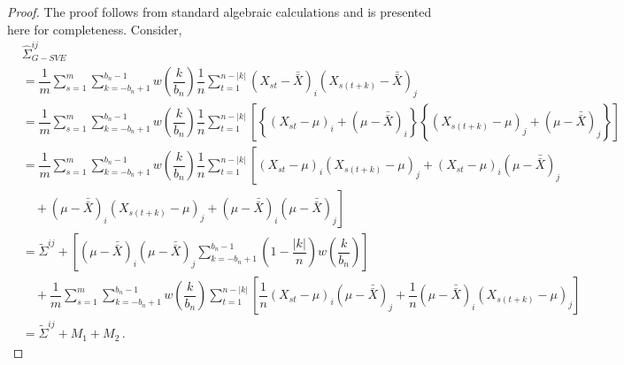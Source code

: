 \documentclass[11pt]{article}
\theoremstyle{remark}
\begin{document}
\begin{proof}
The proof follows from standard algebraic calculations and is presented here for completeness. Consider,
\begin{align*}
&\hat{\Sigma}_{G-SVE}^{ij} \\
&= \dfrac{1}{m}\sum_{s=1}^{m} \sum_{k=-b_n+1}^{b_n-1}w\left(\dfrac{k}{b_n}\right)\dfrac{1}{n}\sum_{t=1}^{n-|k|} \left(X_{st}-\bar{\bar{X}} \right)_i \left(X_{s(t+k)}-\bar{\bar{X}} \right)_j\\
&= \dfrac{1}{m}\sum_{s=1}^{m}\sum_{k=-b_n+1}^{b_n-1}w\left(\dfrac{k}{b_n}\right)\dfrac{1}{n}\sum_{t=1}^{n-|k|} \left[  \left\{\left(X_{st}-\mu \right)_i + \left(\mu-\bar{\bar{X}} \right)_i \right \}  \left\{ \left(X_{s(t+k)}-\mu \right)_j + \left(\mu-\bar{\bar{X}} \right)_j \right \} \right]\\
&= \dfrac{1}{m}\sum_{s=1}^{m}\sum_{k=-b_n+1}^{b_n-1}w\left(\dfrac{k}{b_n}\right)\dfrac{1}{n}\sum_{t=1}^{n-|k|}  \left[ \left(X_{st}-\mu \right)_i  \left(X_{s(t+k)}-\mu \right)_j+  \left(X_{st} - \mu \right)_i    \left(\mu - \bar{\bar{X}} \right)_j \right. \\  
& \quad + \left. \left(\mu-\bar{\bar{X}} \right)_i  \left(X_{s(t+k)}-\mu \right)_j + \left(\mu-\bar{\bar{X}} \right)_i  \left(\mu-\bar{\bar{X}}  \right)_j  \right]\\
& = \tilde{\Sigma}^{ij} + \left[(\mu-\bar{\bar{X}})_i(\mu-\bar{\bar{X}})_j\sum_{k=-b_n+1}^{b_n-1}\left(1-\dfrac{|k|}{n}\right)w\left(\dfrac{k}{b_n}\right)\right] \\ 
& \quad  + \dfrac{1}{m}\sum_{s=1}^{m}\sum_{k=-b_n+1}^{b_n-1}  w\left(\dfrac{k}{b_n}\right)\sum_{t=1}^{n-|k|}  \left[\dfrac{1}{n} \left(X_{st} - \mu \right)_i \left(\mu - \bar{\bar{X}} \right)_j + \dfrac{1}{n} \left(\mu-\bar{\bar{X}} \right)_i  \left(X_{s(t+k)}-\mu \right)_j \right] \\ 
& = \tilde{\Sigma}^{ij} + M_1 + M_2\,.
\end{align*}


\end{proof}
\end{document}
